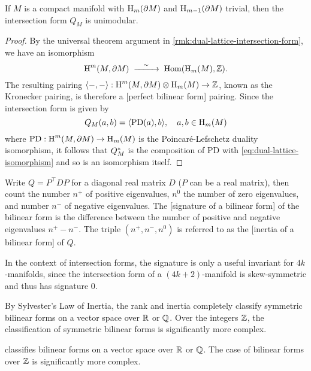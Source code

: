 \begin{proposition}\label{prop:unimodular-intersection-form}
	 If $M$ is a compact manifold with $\operatorname{H}_m(\partial M)$ and $\operatorname{H}_{m-1}(\partial M)$ trivial, then the intersection form $Q_M$ is unimodular.
\end{proposition}
\begin{proof}
	By the universal theorem argument in \cref{rmk:dual-lattice-intersection-form}, we have an isomorphism
	\begin{equation}\label{eq:dual-lattice-isomorphism}
		\H^m(M,\partial M) \lkxisom \Hom(\H_m(M), \Z).
	\end{equation}
	The resulting pairing $\langle -, -\rangle : \operatorname{H}^m(M,\partial M)\otimes \operatorname{H}_m(M) \to \mathbb{Z}$, known as the Kronecker pairing, is therefore a [perfect bilinear form] pairing. Since the intersection form is given by
	\[
		Q_M(a,b) = \langle \mathrm{PD}(a), b\rangle,\quad a,b\in \operatorname{H}_m(M)
	\]
	where $\mathrm{PD} : \operatorname{H}^{m}(M,\partial M) \to \operatorname{H}_m(M)$ is the Poincar\'e-Lefschetz duality isomorphism, it follows that $Q_M^*$ is the composition of $\mathrm{PD}$ with \cref{eq:dual-lattice-isomorphism} and so is an isomorphism itself.
\end{proof}

\begin{example}
\end{example}

\begin{definition}
	Write $Q=P^\intercal D P$ for a diagonal real matrix $D$ ($P$ can be a real matrix), then count the number $n^+$ of positive eigenvalues, $n^0$ the number of zero eigenvalues, and number $n^-$ of negative eigenvalues. The [signature of a bilinear form] of the bilinear form is the difference between the number of positive and negative eigenvalues $n^+-n^-$.
	The triple $(n^+, n^-, n^0)$ is referred to as the [inertia of a bilinear form] of $Q$.
\end{definition}

In the context of intersection forms, the signature is only a useful invariant for $4k$-manifolds, since the intersection form of a $(4k+2)$-manifold is skew-symmetric and thus has signature $0$.

\begin{remark}
	By Sylvester's Law of Inertia, the rank and inertia completely classify symmetric bilinear forms on a vector space over $\mathbb{R}$ or $\mathbb{Q}$. Over the integers $\mathbb{Z}$, the classification of symmetric bilinear forms is significantly more complex.

	classifies bilinear forms on a vector space over $\mathbb{R}$ or $\mathbb{Q}$. The case of bilinear forms over $\mathbb{Z}$ is significantly more complex.
\end{remark}

